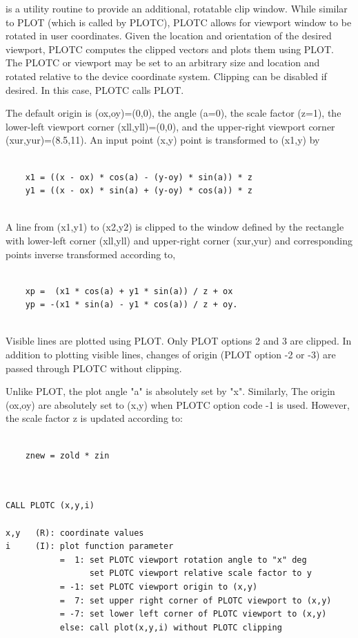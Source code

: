 \documentclass[11pt]{report}
\begin{document}
 is a utility routine to provide an additional, rotatable clip
window.  While similar to PLOT (which is called by PLOTC), PLOTC allows
for viewport window to be rotated in user coordinates.
Given the location and orientation of the desired viewport,
PLOTC computes the clipped vectors and plots them using PLOT.
The PLOTC  or viewport may be set to an arbitrary
size and location and rotated relative to the device coordinate system.
Clipping can be disabled if desired.  In this case, PLOTC calls PLOT.

The default origin is (ox,oy)=(0,0), the angle (a=0), the scale factor
(z=1), the lower-left viewport corner (xll,yll)=(0,0), and the upper-right
viewport corner (xur,yur)=(8.5,11).
An input point (x,y) point is transformed to (x1,y) by 
\begin{verbatim}

    x1 = ((x - ox) * cos(a) - (y-oy) * sin(a)) * z
    y1 = ((x - ox) * sin(a) + (y-oy) * cos(a)) * z
 
\end{verbatim}
A line from (x1,y1) to (x2,y2) is clipped to the window defined by
the rectangle with lower-left corner (xll,yll) and upper-right corner
(xur,yur) and corresponding points inverse transformed according to,
\begin{verbatim}

    xp =  (x1 * cos(a) + y1 * sin(a)) / z + ox
    yp = -(x1 * sin(a) - y1 * cos(a)) / z + oy.
 
\end{verbatim}
Visible lines are plotted using PLOT.  Only PLOT options 2 and 3
are clipped.  In addition to plotting visible lines, changes of origin
(PLOT option -2 or -3) are passed through PLOTC without clipping.

Unlike PLOT, the plot angle "a" is absolutely set by "x".  Similarly,
The origin (ox,oy) are absolutely set to (x,y) when PLOTC option code -1 
is used.  However, the scale factor z is updated according to:
\begin{verbatim}

    znew = zold * zin
	
\end{verbatim}
\begin{verbatim}

CALL PLOTC (x,y,i)

x,y   (R): coordinate values
i     (I): plot function parameter
           =  1: set PLOTC viewport rotation angle to "x" deg
                 set PLOTC viewport relative scale factor to y
           = -1: set PLOTC viewport origin to (x,y)
           =  7: set upper right corner of PLOTC viewport to (x,y)
           = -7: set lower left corner of PLOTC viewport to (x,y)
           else: call plot(x,y,i) without PLOTC clipping
\end{verbatim}
\end{document}
